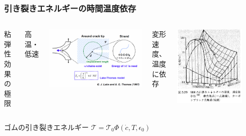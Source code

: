 \documentclass[11pt, dvipdfmx]{beamer}
\begin{document}
\begin{frame}
\frametitle{引き裂きエネルギーの時間温度依存}

%

\begin{columns}[totalwidth=1\textwidth]

粘弾性効果の極限

高温・低速

\includegraphics[width=\textwidth]{fig/Lake_Thomas.png}


変形速度、温度に依存

\includegraphics[width=0.8\textwidth]{fig/break_TT.png}

\end{columns}

\begin{alertblock}{ゴムの引き裂きエネルギー}
$\mathcal{T}=\mathcal{T}_0 \Phi(\dot{c}, T, \epsilon_0)$
\end{alertblock}

\end{frame}
\end{document}

